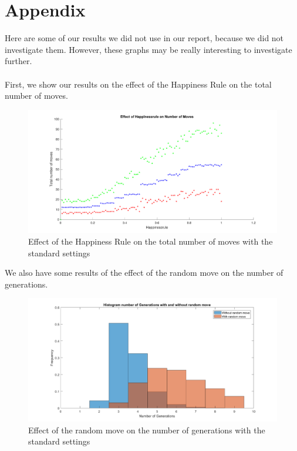 \section*{Appendix} 

Here are some of our results we did not use in our report, because we did not investigate them.
However, these graphs may be really interesting to investigate further.\\
\\
First, we show our results on the effect of the Happiness Rule on the total number of moves.

\begin{figure}[H]
	\centering
    \includegraphics[width=\textwidth]{happinessregel-aantmov.pdf}
    \caption{Effect of the Happiness Rule on the total number of moves with the standard settings}
    \label{fig:happinessrule-moves}
\end{figure}

We also have some results of the effect of the random move on the number of generations.

\begin{figure}[H]
	\centering
    \includegraphics[width=\textwidth]{histaantgenrandverp.pdf}
    \caption{Effect of the random move on the number of generations with the standard settings}
    \label{fig:randmove-generations}
\end{figure}

